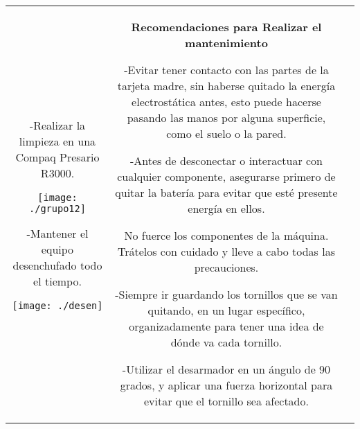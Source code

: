 \documentclass[landscape,12pt]{report}
\begin{document}
\begin{tabular}{c c c}
\begin{minipage}[t]{8.2cm}
					
				
					\medskip
					-Realizar la limpieza en una Compaq Presario R3000.
					
					\medskip
					\begin{flushright}
				    	\texttt{[image: ./grupo12]}
			   	\end{flushright}
			    	
					\medskip
					-Mantener el equipo desenchufado todo el tiempo.
					
					\begin{center}
				    	\texttt{[image: ./desen]}
			   	\end{center}

					
			\end{minipage}& 
			\begin{minipage}[t]{8.2cm}%
			 
			\vspace{0.7cm}
            	\begin{center}
				\Large \bf
				Recomendaciones para Realizar el mantenimiento 
				\end{center}

				\medskip
					-Evitar tener contacto con las partes de la tarjeta madre, sin haberse quitado la energ\'ia electrost\'atica antes, esto puede hacerse pasando las manos por alguna superficie, como el suelo o la pared.
					
				
					
					\medskip
					-Antes de desconectar o interactuar con cualquier componente, asegurarse primero de quitar la bater\'ia para evitar que est\'e presente energ\'ia en ellos.

					
			   	
			   		\medskip

					 No fuerce los componentes de la m\'aquina. Tr\'atelos con cuidado y lleve a 								cabo todas las precauciones.
			   	
			   	\medskip
					-Siempre ir guardando los tornillos que se van quitando, en un lugar espec\'ifico, organizadamente para tener una idea de d\'onde va cada tornillo.
			   	
			   	\medskip
			   	    -Utilizar el desarmador en un \'angulo de 90 grados, y aplicar una fuerza horizontal para evitar que el tornillo sea afectado.
				\end{minipage}
				& 
				\begin{minipage}[t]{8.2cm} %
					

\end{minipage}
\end{tabular}
\end{document}
